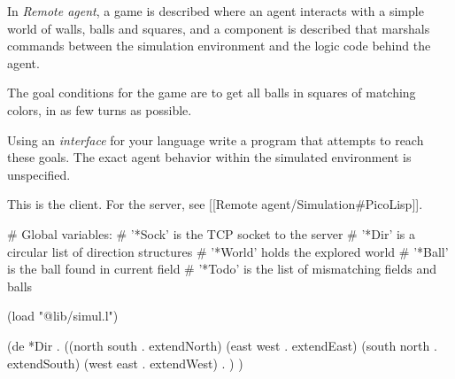 In \emph{Remote agent}, a game is described where an agent interacts
with a simple world of walls, balls and squares, and a component is
described that marshals commands between the simulation environment
and the logic code behind the agent.

The goal conditions for the game are to get all balls in squares of
matching colors, in as few turns as possible.

Using an \emph{interface} for your language write a program that
attempts to reach these goals. The exact agent behavior within the
simulated environment is unspecified.


\begin{wideverbatim}

This is the client. For the server, see [[Remote agent/Simulation#PicoLisp]].

# Global variables:
#  '*Sock' is the TCP socket to the server
#  '*Dir' is a circular list of direction structures
#  '*World' holds the explored world
#  '*Ball' is the ball found in current field
#  '*Todo' is the list of mismatching fields and balls

(load "@lib/simul.l")

(de *Dir .
   ((north south . extendNorth) (east west . extendEast)
      (south north . extendSouth) (west east . extendWest) . ) )

\end{wideverbatim}

